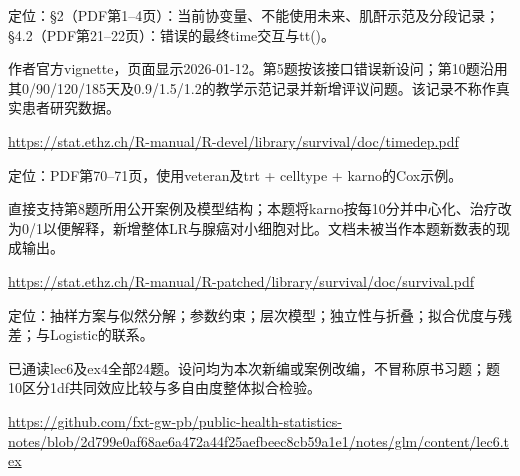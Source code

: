 \par\noindent\begin{minipage}{\linewidth}\raggedright{}\label{src:G5-TIMEDEP}
\par
定位：§2（PDF第1--4页）：当前协变量、不能使用未来、肌酐示范及分段记录；§4.2（PDF第21--22页）：错误的最终time交互与tt()。\par
作者官方vignette，页面显示2026-01-12。第5题按该接口错误新设问；第10题沿用其0/90/120/185天及0.9/1.5/1.2的教学示范记录并新增评议问题。该记录不称作真实患者研究数据。\par
{\small \url{https://stat.ethz.ch/R-manual/R-devel/library/survival/doc/timedep.pdf}}\par
\end{minipage}\par\medskip

\par\noindent\begin{minipage}{\linewidth}\raggedright{}\label{src:G5-VIGNETTE}
\par
定位：PDF第70--71页，使用veteran及trt + celltype + karno的Cox示例。\par
直接支持第8题所用公开案例及模型结构；本题将karno按每10分并中心化、治疗改为0/1以便解释，新增整体LR与腺癌对小细胞对比。文档未被当作本题新数表的现成输出。\par
{\small \url{https://stat.ethz.ch/R-manual/R-patched/library/survival/doc/survival.pdf}}\par
\end{minipage}\par\medskip

\par\noindent\begin{minipage}{\linewidth}\raggedright{}\label{src:G6-NOTE}
\par
定位：抽样方案与似然分解；参数约束；层次模型；独立性与折叠；拟合优度与残差；与Logistic的联系。\par
已通读lec6及ex4全部24题。设问均为本次新编或案例改编，不冒称原书习题；题10区分1df共同效应比较与多自由度整体拟合检验。\par
{\small \url{https://github.com/fxt-gw-pb/public-health-statistics-notes/blob/2d799e0af68ae6a472a44f25aefbeec8cb59a1e1/notes/glm/content/lec6.tex}}\par
\end{minipage}\par\medskip

